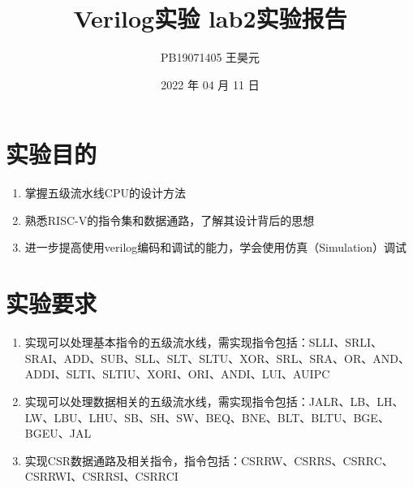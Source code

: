 \documentclass[UTF8]{article}
\title{Verilog实验 lab2实验报告}
\author{PB19071405 王昊元}
\date{2022 年 04 月 11 日}
\begin{document}
    \maketitle
    \section{实验目的}
    \begin{enumerate}
        \item 掌握五级流水线CPU的设计方法
        \item 熟悉RISC-V的指令集和数据通路，了解其设计背后的思想
        \item 进一步提高使用verilog编码和调试的能力，学会使用仿真（Simulation）调试
    \end{enumerate}
    \section{实验要求}
    \begin{enumerate}
        \item 实现可以处理基本指令的五级流水线，需实现指令包括：SLLI、SRLI、SRAI、ADD、SUB、SLL、SLT、SLTU、XOR、SRL、SRA、OR、AND、ADDI、SLTI、SLTIU、XORI、ORI、ANDI、LUI、AUIPC
        \item 实现可以处理数据相关的五级流水线，需实现指令包括：JALR、LB、LH、LW、LBU、LHU、SB、SH、SW、BEQ、BNE、BLT、BLTU、BGE、BGEU、JAL
        \item 实现CSR数据通路及相关指令，指令包括：CSRRW、CSRRS、CSRRC、CSRRWI、CSRRSI、CSRRCI
    \end{enumerate}
\end{document}
